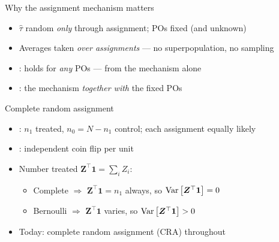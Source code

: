 \documentclass[table, xcolor = {dvipsnames}, 9pt]{beamer}
\theoremstyle{plain}
\newcommand{\mh}[1]{{\color{magenta}{#1}}}
\DeclareMathOperator{\Var}{\rm{Var}}
\begin{document}
\begin{frame}[t]{Why the assignment mechanism matters}
\vfill
\begin{itemize} \vfill
\item $\hat{\tau}$ random \emph{only} through assignment; POs fixed (and unknown) \vfill
\item Averages taken \emph{over assignments} --- no superpopulation, no sampling \vfill
\item \mh{Unbiasedness}: holds for \emph{any} POs --- from the mechanism alone \vfill
\item \mh{Variance}: the mechanism \emph{together with} the fixed POs \vfill
\end{itemize} \vfill
\end{frame}
\begin{frame}[t]{Complete random assignment}
\vfill
\begin{itemize} \vfill
\item \mh{Complete}: $n_1$ treated, $n_0 = N - n_1$ control; each assignment equally likely \vfill
\item \mh{Bernoulli}: independent coin flip per unit \vfill
\item Number treated $\bm{Z}^{\top}\bm{1} = \sum_i Z_i$: \vfill
\begin{itemize} \vfill
\item Complete $\Rightarrow$ $\bm{Z}^{\top}\bm{1} = n_1$ always, so $\Var\left[\bm{Z}^{\top}\bm{1}\right] = 0$ \vfill
\item Bernoulli $\Rightarrow$ $\bm{Z}^{\top}\bm{1}$ varies, so $\Var\left[\bm{Z}^{\top}\bm{1}\right] > 0$ \vfill
\end{itemize} \vfill
\item Today: complete random assignment (CRA) throughout \vfill
\end{itemize} \vfill
\end{frame}
\end{document}
